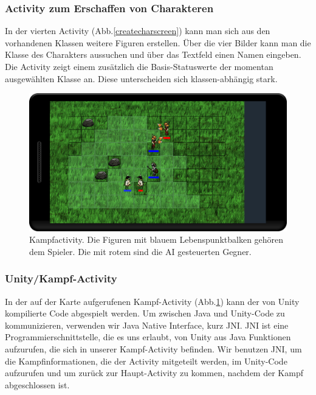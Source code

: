 \documentclass[extern,palatino]{cgBA}
\begin{document}
\subsubsection{Activity zum Erschaffen von Charakteren}
In der vierten Activity (Abb.\ref{createcharscreen}) kann man sich aus den vorhandenen Klassen weitere Figuren erstellen. Über die vier Bilder kann man die Klasse des Charakters aussuchen und über das Textfeld einen Namen eingeben. Die Activity zeigt einem zusätzlich die Basis-Statuswerte der momentan ausgewählten Klasse an. Diese unterscheiden sich klassen-abhängig stark.
\newpage
\begin{figure}[H]
		\centering
		\includegraphics[width=1.0\textwidth]{fightscreen.png}
		\caption{Kampfactivity. Die Figuren mit blauem Lebenspunktbalken gehören dem Spieler. Die mit rotem sind die AI gesteuerten Gegner.}
		\label{fightscreen}
\end{figure}
\subsubsection{Unity/Kampf-Activity}
In der auf der Karte aufgerufenen Kampf-Activity (Abb.\ref{fightscreen}) kann der von Unity kompilierte Code abgespielt werden. Um zwischen Java und Unity-Code zu kommunizieren, verwenden wir Java Native Interface, kurz JNI. JNI ist eine Programmierschnittstelle, die es uns erlaubt, von Unity aus Java Funktionen aufzurufen, die sich in unserer Kampf-Activity befinden. Wir benutzen JNI, um die Kampfinformationen, die der Activity mitgeteilt werden, im Unity-Code aufzurufen und um zurück zur Haupt-Activity zu kommen, nachdem der Kampf abgeschlossen ist.
\newpage
\end{document}
